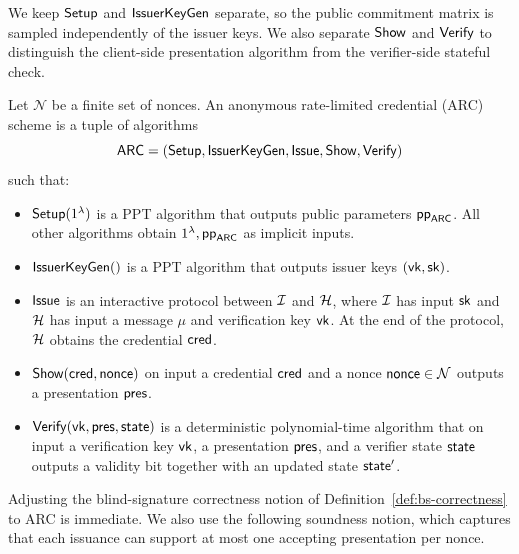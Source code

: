 We keep \(\mathsf{Setup}\) and \(\mathsf{IssuerKeyGen}\) separate, so the public commitment matrix is sampled independently of the issuer
keys. We also separate \(\mathsf{Show}\) and \(\mathsf{Verify}\) to distinguish the client-side presentation algorithm from the
verifier-side stateful check.
\begin{definition}\label{def:arc-syntax}
Let $\mathcal{N}$ be a finite set of nonces. 
An anonymous rate-limited credential (ARC) scheme is a tuple of algorithms
\[
  \mathsf{ARC}=(\mathsf{Setup},\mathsf{IssuerKeyGen},\mathsf{Issue},\mathsf{Show},\mathsf{Verify})
\]
such that:
\begin{itemize}[leftmargin=1.25em]
   \item $\mathsf{Setup}(1^\lambda)$ is a PPT algorithm that outputs public parameters $\mathsf{pp}_{\mathsf{ARC}}$. All other algorithms obtain $1^\lambda,\mathsf{pp}_{\mathsf{ARC}}$ as implicit inputs.

    \item $\mathsf{IssuerKeyGen}()$ is a PPT algorithm that outputs issuer keys $(\mathsf{vk},\mathsf{sk})$.
\item $\mathsf{Issue}$ is an interactive protocol between $\mathcal{I}$ and $\mathcal{H}$, where $\mathcal{I}$ has input $\mathsf{sk}$ and $\mathcal{H}$ has input a message $\mu$ and verification key $\mathsf{vk}$. At the end of the protocol, $\mathcal{H}$ obtains the credential $\mathsf{cred}$.
  \item $\mathsf{Show}(\mathsf{cred},\mathsf{nonce})$ on input a credential $\mathsf{cred}$ and a nonce $\mathsf{nonce}\in \mathcal{N}$ outputs a presentation $\mathsf{pres}$.
  
  \item $\mathsf{Verify}(\mathsf{vk},\mathsf{pres},\mathsf{state})$ is a deterministic polynomial-time algorithm that on input a verification key $\mathsf{vk}$, a presentation $\mathsf{pres}$, and a verifier state $\mathsf{state}$ outputs a validity bit together with an updated state $\mathsf{state}'$.
	 \end{itemize}
\end{definition}

Adjusting the blind-signature correctness notion of Definition~\ref{def:bs-correctness} to ARC is immediate. We also use
the following soundness notion, which captures that each issuance can support at most one accepting presentation per
nonce.


